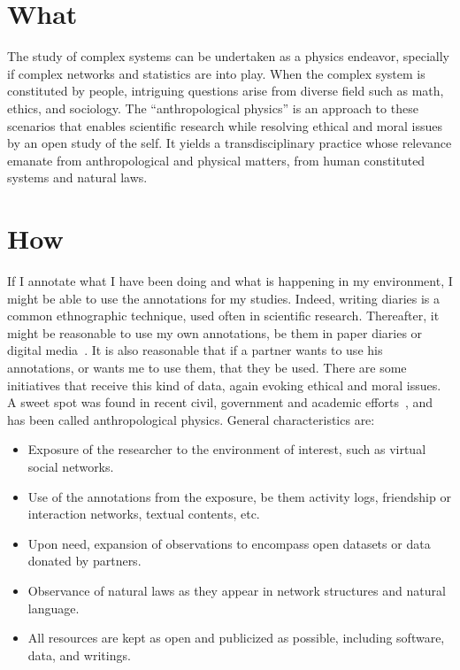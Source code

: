 \documentclass[a4paper, 11pt]{article} %
\begin{document}
\section*{What}
The study of complex systems can be undertaken as a physics endeavor, specially if complex networks and statistics are into play.
When the complex system is constituted by people, intriguing questions arise from diverse field such as math, ethics, and sociology. The ``anthropological physics'' is an approach to these scenarios that enables scientific research while resolving ethical and moral issues by an open study of the self. It yields a transdisciplinary practice whose relevance emanate from anthropological and physical matters, from human constituted systems and natural laws.

\section*{How}
If I annotate what I have been doing and what is happening in my environment, I might be able to use the annotations for my studies.
Indeed, writing diaries is a common ethnographic technique, used often in scientific research. Thereafter, it might be reasonable
to use my own annotations, be them in paper diaries or digital media~\cite{wolfram}. It is also reasonable that if a partner wants to use his annotations, or wants me to use them, that they be used. There are some initiatives that receive this kind of data, again evoking ethical and moral issues. A sweet spot was found in recent civil, government and academic efforts~\cite{pnud5,ensaio}, and has been called anthropological physics. General characteristics are:

\begin{itemize}
    \item Exposure of the researcher to the environment of interest, such as virtual social networks.
    \item Use of the annotations from the exposure, be them activity logs, friendship or interaction networks, textual contents, etc.
    \item Upon need, expansion of observations to encompass open datasets or data donated by partners.
    \item Observance of natural laws as they appear in network structures and natural language.
    \item All resources are kept as open and publicized as possible, including software, data, and writings.
\end{itemize}
\end{document}
